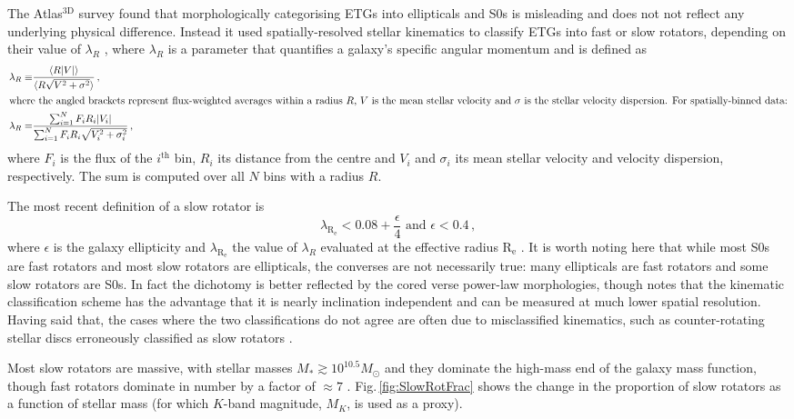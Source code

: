 	The Atlas$^\text{3D}$ survey \citep{Cappellari2011} found that morphologically categorising ETGs into ellipticals and S0s is misleading and does not not reflect any underlying physical difference. Instead it used spatially-resolved stellar kinematics to classify ETGs into fast or slow rotators, depending on their value of $\lambda_R$ \citep{Emsellem2011}, where $\lambda_R$ is a parameter that quantifies a galaxy's specific angular momentum and is defined as
	\begin{align}
		\lambda_R \equiv & \frac{\langle R |V|\rangle}{\langle R \sqrt{V^2 + \sigma^2}\rangle} \, ,\\
		\intertext{where the angled brackets represent flux-weighted averages within a radius $R$, $V$ is the mean stellar velocity and $\sigma$ is the stellar velocity dispersion. For spatially-binned data:}
		\lambda_R = & \frac{\sum_{i=1}^{N} F_i R_i |V_i|}{\sum_{i=1}^{N} F_i R_i \sqrt{V_i^2 + \sigma_i^2}} \, ,
	\end{align}
	where $F_i$ is the flux of the $i^\text{th}$ bin, $R_i$ its distance from the centre and $V_i$ and $\sigma_i$ its mean stellar velocity and velocity dispersion, respectively. The sum is computed over all $N$ bins with a radius $R$. 

	The most recent definition of a slow rotator is
	\begin{equation}
		\lambda_\mathrm{R_e} < 0.08 + \frac{\epsilon}{4} \text{    and    } \epsilon < 0.4 \, ,
	\end{equation}
	where $\epsilon$ is the galaxy ellipticity and $\lambda_\mathrm{R_e}$ the value of $\lambda_R$ evaluated at the effective radius $\mathrm{R_e}$ \citep{Cappellari2016}. %
	It is worth noting here that while most S0s are fast rotators and most slow rotators are ellipticals, the converses are not necessarily true: many ellipticals are fast rotators and some slow rotators are S0s. In fact the dichotomy is better reflected by the cored verse power-law morphologies, though \citet{Cappellari2016} notes that the kinematic classification scheme has the advantage that it is nearly inclination independent and can be measured at much lower spatial resolution. Having said that, the cases where the two classifications do not agree are often due to misclassified kinematics, such as counter-rotating stellar discs erroneously classified as slow rotators \citep[e.g.][]{Pinkney2003, Cappellari2005, Cappellari2007}. 

	Most slow rotators are massive, with stellar masses $M_\ast \gtrsim 10^{10.5} M_\odot$ and they dominate the high-mass end of the galaxy mass function, though fast rotators dominate in number by a factor of $\approx 7$ \citep[e.g.][]{Emsellem2011, Veale2017}. Fig.\,\ref{fig:SlowRotFrac} shows the change in the proportion of slow rotators as a function of stellar mass (for which $K$-band magnitude, $M_K$, is used as a proxy).


